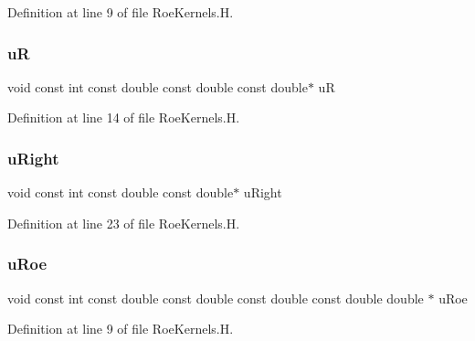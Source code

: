 Definition at line 9 of file Roe\+Kernels.\+H.

\hypertarget{RoeKernels_8H_a1ea2314c87ebfdd0ac10106c76b3bd08}{}\label{RoeKernels_8H_a1ea2314c87ebfdd0ac10106c76b3bd08} 
\subsubsection{\texorpdfstring{uR}{uR}}
{\footnotesize\ttfamily void const int const double const double const double$\ast$ uR}



Definition at line 14 of file Roe\+Kernels.\+H.

\hypertarget{RoeKernels_8H_ad7596a27f3010967e23b245f06eadfdd}{}\label{RoeKernels_8H_ad7596a27f3010967e23b245f06eadfdd} 
\subsubsection{\texorpdfstring{u\+Right}{uRight}}
{\footnotesize\ttfamily void const int const double const double$\ast$ u\+Right}



Definition at line 23 of file Roe\+Kernels.\+H.

\hypertarget{RoeKernels_8H_a5624e61551b02c502a36c52d56b2350b}{}\label{RoeKernels_8H_a5624e61551b02c502a36c52d56b2350b} 
\subsubsection{\texorpdfstring{u\+Roe}{uRoe}}
{\footnotesize\ttfamily void const int const double const double const double const double double $\ast$ u\+Roe}



Definition at line 9 of file Roe\+Kernels.\+H.

